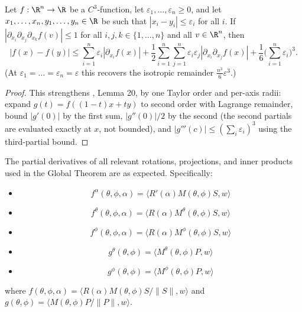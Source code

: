 \begin{lemma} \label{lem:n2}
\leanok
    Let $f:\R^n\to \R$ be a $C^3$-function, let
    $\varepsilon_1,\dots,\varepsilon_n \geq 0$, and let
    $x_1,\dots,x_n,y_1,\dots,y_n \in \R$ be such that
    $|x_i-y_i|\leq \varepsilon_i$ for all $i$.
    If
    \(
        \left|\partial_{x_i}\partial_{x_j}\partial_{x_k}f(v)\right| \leq 1
    \)
    for all $i,j,k \in \{1,\dots,n\}$ and all $v \in \R^n$, then
    \[
    |f(x)-f(y)|\leq \sum_{i=1}^n \varepsilon_i |\partial_{x_i} f(x)|
      + \frac{1}{2} \sum_{i=1}^n \sum_{j=1}^n \varepsilon_i \varepsilon_j
          |\partial_{x_i}\partial_{x_j} f(x)|
      + \frac{1}{6}\Big(\sum_{i=1}^n \varepsilon_i\Big)^3.
    \]
    (At $\varepsilon_1 = \dots = \varepsilon_n = \varepsilon$ this recovers the
    isotropic remainder $\frac{n^3}{6}\varepsilon^3$.)
\end{lemma}

\begin{proof}
\leanok
This strengthens \cite{polyhedron.without.rupert}, Lemma 20, by one Taylor
order and per-axis radii: expand $g(t) = f((1-t)x + ty)$ to second order with
Lagrange remainder, bound $|g'(0)|$ by the first sum, $|g''(0)|/2$ by the
second (the second partials are evaluated exactly at $x$, not bounded), and
$|g'''(c)| \le (\sum_i \varepsilon_i)^3$ using the third-partial bound.
\end{proof}

\begin{lemma}
\label{lem:rotation_derivatives}
\leanok
{}
The partial derivatives of all relevant rotations, projections, and inner products
used in the Global Theorem are as expected.
Specifically:
\begin{itemize}
\item \[  f^\alpha(\theta,\phi,\alpha) = \langle R'(\alpha) M(\theta, \phi) S, w \rangle \]
\item \[  f^\theta(\theta,\phi,\alpha) = \langle R(\alpha) M^\theta(\theta, \phi) S, w \rangle \]
\item \[  f^\phi(\theta,\phi,\alpha) = \langle R(\alpha) M^\phi(\theta, \phi) S, w \rangle \]
\item \[  g^\theta(\theta,\phi) = \langle  M^\theta(\theta, \phi) P, w \rangle \]
\item \[  g^\phi(\theta,\phi) = \langle  M^\phi(\theta, \phi) P, w \rangle \]
\end{itemize}
where $f(\theta,\phi,\alpha) =  \langle R(\alpha) M(\theta,\phi) S / \|S\|, w\rangle $
and $g(\theta,\phi) =  \langle M(\theta,\phi) P / \|P\|, w\rangle $.
\end{lemma}

